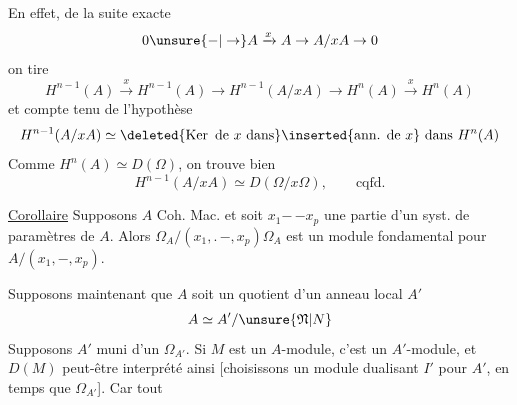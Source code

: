En effet, de la suite exacte
\[
0\unsure{-|\to} A\xrightarrow{x}A\to A/xA\to0
\]
on tire
\[
H^{n-1}(A)\xrightarrow{x}H^{n-1}(A)\to H^{n-1}(A/xA)\to H^n(A)\xrightarrow{x}H^n(A)
\]
et compte tenu de l'hypothèse
\[
H^{n-1}(A/xA)\simeq\deleted{\operatorname{Ker}\text{ de }x\text{ dans}}\inserted{\text{ann. de }x}\text{ dans }H^n(A)
\]
Comme $H^n(A)\simeq D(\Omega)$, on trouve bien
\[
H^{n-1}(A/xA)\simeq D(\Omega/x\Omega),\qquad\text{cqfd.}
\]

\uline{Corollaire} Supposons $A$ Coh. Mac. et soit
$x_1\mathord{-}\,\mathord{-}x_p$ une partie d'un syst. de
paramètres de $A$. Alors $\Omega_A/(x_1,\mathord{.}\,\mathord{-},x_p)\Omega_A$ est
un module fondamental pour $A/(x_1,\mathord{-},x_p)$.

Supposons maintenant que $A$ soit un
quotient d'un anneau local  $A'$
\[
A\simeq A'/\unsure{\mathfrak N|N}
\]
Supposons $A'$ muni d'un $\Omega_{A'}$. Si
$M$ est un $A$-module, c'est un $A'$-module,
et $D(M)$ peut-être interprété ainsi
[choisissons un module dualisant $I'$  pour $A'$,
en \unsure{$=$|$\simeq$} temps que $\Omega_{A'}$]. Car tout 

